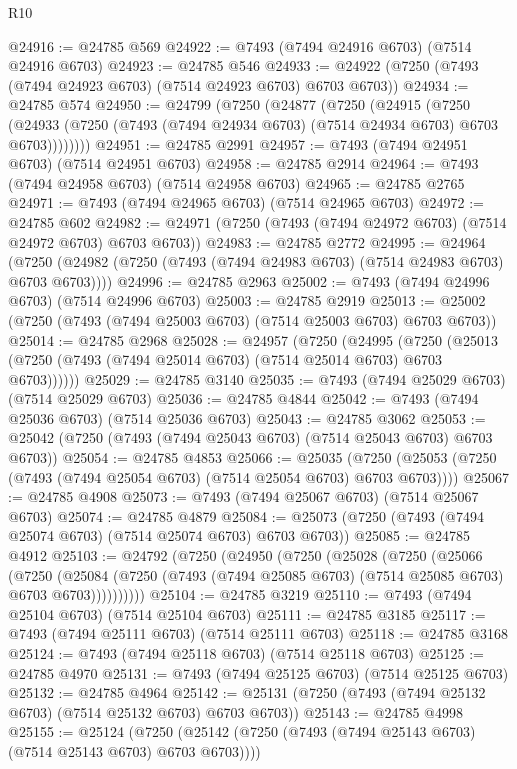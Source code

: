 \begin{lexlean}{R10}
\begin{coremodule}
{{{{{{{{{{{{{{{{{{{{{{{{{{{{{{{{{{{{{{{{{{{{{{{{{{{{{{{{{{{{{{{{{{{{{{{{{{{{{{{{{{{{@24916 := @24785 @569
@24922 := @7493 (@7494 @24916 @6703) (@7514 @24916 @6703)
@24923 := @24785 @546
@24933 := @24922 (@7250 (@7493 (@7494 @24923 @6703) (@7514 @24923 @6703) @6703 @6703))
@24934 := @24785 @574
@24950 := @24799
    (@7250
      (@24877
        (@7250
          (@24915
            (@7250
              (@24933 (@7250 (@7493 (@7494 @24934 @6703) (@7514 @24934 @6703) @6703 @6703))))))))
@24951 := @24785 @2991
@24957 := @7493 (@7494 @24951 @6703) (@7514 @24951 @6703)
@24958 := @24785 @2914
@24964 := @7493 (@7494 @24958 @6703) (@7514 @24958 @6703)
@24965 := @24785 @2765
@24971 := @7493 (@7494 @24965 @6703) (@7514 @24965 @6703)
@24972 := @24785 @602
@24982 := @24971 (@7250 (@7493 (@7494 @24972 @6703) (@7514 @24972 @6703) @6703 @6703))
@24983 := @24785 @2772
@24995 := @24964
    (@7250 (@24982 (@7250 (@7493 (@7494 @24983 @6703) (@7514 @24983 @6703) @6703 @6703))))
@24996 := @24785 @2963
@25002 := @7493 (@7494 @24996 @6703) (@7514 @24996 @6703)
@25003 := @24785 @2919
@25013 := @25002 (@7250 (@7493 (@7494 @25003 @6703) (@7514 @25003 @6703) @6703 @6703))
@25014 := @24785 @2968
@25028 := @24957
    (@7250
      (@24995
        (@7250 (@25013 (@7250 (@7493 (@7494 @25014 @6703) (@7514 @25014 @6703) @6703 @6703))))))
@25029 := @24785 @3140
@25035 := @7493 (@7494 @25029 @6703) (@7514 @25029 @6703)
@25036 := @24785 @4844
@25042 := @7493 (@7494 @25036 @6703) (@7514 @25036 @6703)
@25043 := @24785 @3062
@25053 := @25042 (@7250 (@7493 (@7494 @25043 @6703) (@7514 @25043 @6703) @6703 @6703))
@25054 := @24785 @4853
@25066 := @25035
    (@7250 (@25053 (@7250 (@7493 (@7494 @25054 @6703) (@7514 @25054 @6703) @6703 @6703))))
@25067 := @24785 @4908
@25073 := @7493 (@7494 @25067 @6703) (@7514 @25067 @6703)
@25074 := @24785 @4879
@25084 := @25073 (@7250 (@7493 (@7494 @25074 @6703) (@7514 @25074 @6703) @6703 @6703))
@25085 := @24785 @4912
@25103 := @24792
    (@7250
      (@24950
        (@7250
          (@25028
            (@7250
              (@25066
                (@7250
                  (@25084
                    (@7250 (@7493 (@7494 @25085 @6703) (@7514 @25085 @6703) @6703 @6703))))))))))
@25104 := @24785 @3219
@25110 := @7493 (@7494 @25104 @6703) (@7514 @25104 @6703)
@25111 := @24785 @3185
@25117 := @7493 (@7494 @25111 @6703) (@7514 @25111 @6703)
@25118 := @24785 @3168
@25124 := @7493 (@7494 @25118 @6703) (@7514 @25118 @6703)
@25125 := @24785 @4970
@25131 := @7493 (@7494 @25125 @6703) (@7514 @25125 @6703)
@25132 := @24785 @4964
@25142 := @25131 (@7250 (@7493 (@7494 @25132 @6703) (@7514 @25132 @6703) @6703 @6703))
@25143 := @24785 @4998
@25155 := @25124
    (@7250 (@25142 (@7250 (@7493 (@7494 @25143 @6703) (@7514 @25143 @6703) @6703 @6703))))
}}}}}}}}}}}}}}}}}}}}}}}}}}}}}}}}}}}}}}}}}}}}}}}}}}}}}}}}}}}}}}}}}}}}}}}}}}}}}}}}}}}}
\end{coremodule}
\end{lexlean}
